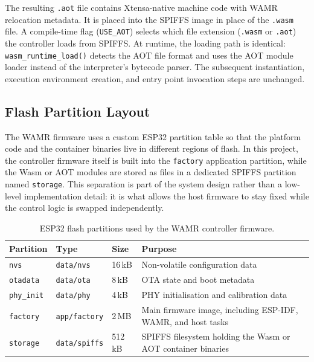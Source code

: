 \documentclass[12pt, a4paper]{report}
\begin{document}
\noindent The resulting \texttt{.aot} file contains Xtensa-native machine code with WAMR relocation metadata. It is placed into the SPIFFS image in place of the \texttt{.wasm} file. A compile-time flag (\texttt{USE\_AOT}) selects which file extension (\texttt{.wasm} or \texttt{.aot}) the controller loads from SPIFFS. At runtime, the loading path is identical: \texttt{wasm\_runtime\_load()} detects the AOT file format and uses the AOT module loader instead of the interpreter's bytecode parser. The subsequent instantiation, execution environment creation, and entry point invocation steps are unchanged.

\subsection{Flash Partition Layout}
\label{subsec:flash-layout}

The WAMR firmware uses a custom ESP32 partition table so that the platform code and the container binaries live in different regions of flash. In this project, the controller firmware itself is built into the \texttt{factory} application partition, while the Wasm or AOT modules are stored as files in a dedicated SPIFFS partition named \texttt{storage}. This separation is part of the system design rather than a low-level implementation detail: it is what allows the host firmware to stay fixed while the control logic is swapped independently.

\begin{table}[htbp]
    \centering
    \caption{ESP32 flash partitions used by the WAMR controller firmware.}
    \label{tab:flash-layout}
    \small
    \begin{tabular}{@{}llll@{}}
        \toprule
        \textbf{Partition} & \textbf{Type} & \textbf{Size} & \textbf{Purpose} \\
        \midrule
        \texttt{nvs}      & \texttt{data/nvs}     & 16\,kB  & Non-volatile configuration data \\
        \texttt{otadata}  & \texttt{data/ota}     & 8\,kB   & OTA state and boot metadata \\
        \texttt{phy\_init}& \texttt{data/phy}     & 4\,kB   & PHY initialisation and calibration data \\
        \texttt{factory}  & \texttt{app/factory}  & 2\,MB   & Main firmware image, including ESP-IDF, WAMR, and host tasks \\
        \texttt{storage}  & \texttt{data/spiffs}  & 512\,kB & SPIFFS filesystem holding the Wasm or AOT container binaries \\
        \bottomrule
    \end{tabular}
\end{table}
\end{document}
